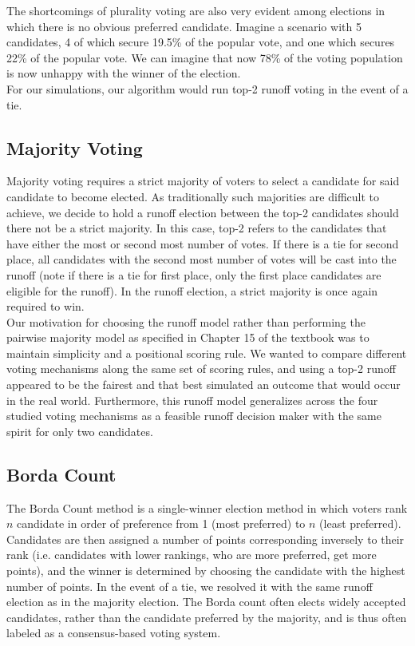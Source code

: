 \documentclass[11pt]{scrartcl}
\begin{document}
The shortcomings of plurality voting are also very evident among elections in which there is no obvious preferred candidate. Imagine a scenario with 5 candidates, 4 of which secure 19.5\% of the popular vote, and one which secures 22\% of the popular vote. We can imagine that now 78\% of the voting population is now unhappy with the winner of the election. \\

For our simulations, our algorithm would run top-2 runoff voting in the event of a tie.

\subsection{Majority Voting}

Majority voting requires a strict majority of voters to select a candidate for said candidate to become elected. As traditionally such majorities are difficult to achieve, we decide to hold a runoff election between the top-2 candidates should there not be a strict majority. In this case, top-2 refers to the candidates that have either the most or second most number of votes. If there is a tie for second place, all candidates with the second most number of votes will be cast into the runoff (note if there is a tie for first place, only the first place candidates are eligible for the runoff). In the runoff election, a strict majority is once again required to win.\\

Our motivation for choosing the runoff model rather than performing the pairwise majority model as specified in Chapter 15 of the textbook was to maintain simplicity and a positional scoring rule. We wanted to compare different voting mechanisms along the same set of scoring rules, and using a top-2 runoff appeared to be the fairest and that best simulated an outcome that would occur in the real world. Furthermore, this runoff model generalizes across the four studied voting mechanisms as a feasible runoff decision maker with the same spirit for only two candidates.

\subsection{Borda Count}

The Borda Count method is a single-winner election method in which voters rank $n$ candidate in order of preference from 1 (most preferred) to $n$ (least preferred). Candidates are then assigned a number of points corresponding inversely to their rank (i.e. candidates with lower rankings, who are more preferred, get more points), and the winner is determined by choosing the candidate with the highest number of points. In the event of a tie, we resolved it with the same runoff election as in the majority election. The Borda count often elects widely accepted candidates, rather than the candidate preferred by the majority, and is thus often labeled as a consensus-based voting system.\\
\end{document}
